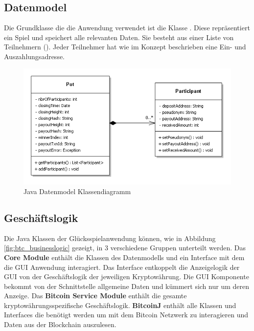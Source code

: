 \subsection{Datenmodel}
Die Grundklasse die die Anwendung verwendet ist die Klasse . Diese repräsentiert ein Spiel und speichert alle relevanten Daten. Sie besteht aus einer Liste von Teilnehmern (). Jeder Teilnehmer hat wie im Konzept beschrieben eine Ein- und Auszahlungsadresse.
\begin{figure}[H]
\centering
\includegraphics[width=1\linewidth]{Figures/umsetzung_btc/btc_datenmodell}
\decoRule
\caption{Java Datenmodel Klassendiagramm}
\label{fig:btc_datenmodell}
\end{figure}


\subsection{Geschäftslogik}

Die Java Klassen der Glücksspielanwendung können, wie in Abbildung \ref{fig:btc_businesslogic} gezeigt, in 3 verschiedene Gruppen unterteilt werden. Das \textbf{Core Module} enthält die Klassen des Datenmodells und ein Interface mit dem die GUI Anwendung interagiert. Das Interface entkoppelt die Anzeigelogik der GUI von der Geschäftslogik der jeweiligen Kryptowährung. Die GUI Komponente bekommt von der Schnittstelle allgemeine Daten und kümmert sich nur um deren Anzeige.
Das \textbf{Bitcoin Service Module} enthält die gesamte kryptowährungsspezifische Geschäftslogik. \textbf{BitcoinJ} enthält alle Klassen und Interfaces die benötigt werden um mit dem Bitcoin Netzwerk zu interagieren und Daten aus der Blockchain auszulesen.

